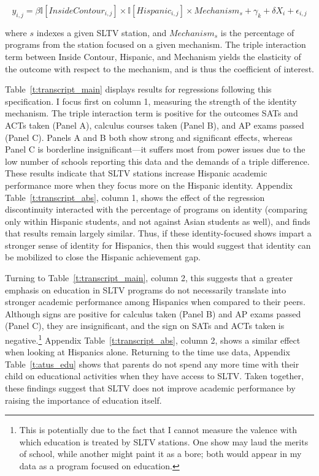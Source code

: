 \documentclass[11pt]{article}
\begin{document}
\[ y_{i,j} =  \beta \mathbb{I}[InsideContour_{i,j}] \times \mathbb{I}[Hispanic_{i,j}] \times Mechanism_{s} + \gamma_k + \delta  X_i + \epsilon_{i,j}\] 

where $s$ indexes a given SLTV station, and $Mechanism_s$ is the percentage of programs from the station focused on a given mechanism. The triple interaction term between Inside Contour, Hispanic, and Mechanism yields the elasticity of the outcome with respect to the mechanism, and is thus the coefficient of interest.

Table~\ref{t:transcript_main} displays results for regressions following this specification. I focus first on column 1, measuring the strength of the identity mechanism. The triple interaction term is positive for the outcomes SATs and ACTs taken (Panel A), calculus courses taken (Panel B), and AP exams passed (Panel C). Panels A and B both show strong and significant effects, whereas Panel C is borderline insignificant---it suffers most from power issues due to the low number of schools reporting this data and the demands of a triple difference. These results indicate that SLTV stations increase Hispanic academic performance more when they focus more on the Hispanic identity. Appendix Table~\ref{t:transcript_abs}, column 1, shows the effect of the regression discontinuity interacted with the percentage of programs on identity (comparing only within Hispanic students, and not against Asian students as well), and finds that results remain largely similar. Thus, if these identity-focused shows impart a stronger sense of identity for Hispanics, then this would suggest that identity can be mobilized to close the Hispanic achievement gap.

Turning to Table~\ref{t:transcript_main}, column 2, this suggests that a greater emphasis on education in SLTV programs do not necessarily translate into stronger academic performance among Hispanics when compared to their peers. Although signs are positive for calculus taken (Panel B) and AP exams passed (Panel C), they are insignificant, and the sign on SATs and ACTs taken is negative.\footnote{ This is potentially due to the fact that I cannot measure the valence with which education is treated by SLTV stations. One show may laud the merits of school, while another might paint it as a bore; both would appear in my data as a program focused on education.} Appendix Table~\ref{t:transcript_abs}, column 2, shows a similar effect when looking at Hispanics alone. Returning to the time use data, Appendix Table~\ref{t:atus_edu} shows that parents do not spend any more time with their child on educational activities when they have access to SLTV. Taken together, these findings suggest that SLTV does not improve academic performance by raising the importance of education itself.
\end{document}
